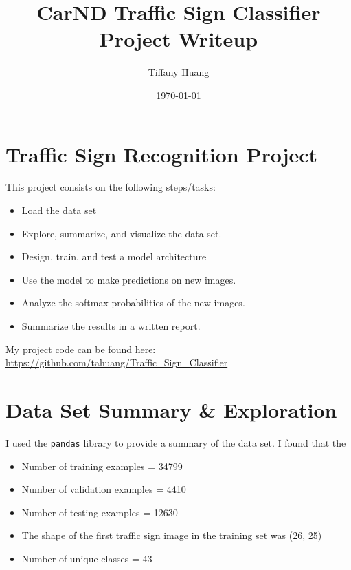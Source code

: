 \documentclass[12pt]{article}
\title{CarND Traffic Sign Classifier Project Writeup}
\author{Tiffany Huang}
\date{\today}
\begin{document}
\maketitle


\section{Traffic Sign Recognition Project}
This project consists on the following steps/tasks:
\begin{itemize}
\item{Load the data set}
\item {Explore, summarize, and visualize the data set.}
\item {Design, train, and test a model architecture}
\item {Use the model to make predictions on new images.}
\item {Analyze the softmax probabilities of the new images.}
\item {Summarize the results in a written report.}
\end{itemize}
My project code can be found here: \url{https://github.com/tahuang/Traffic_Sign_Classifier}

\section{Data Set Summary \& Exploration}
I used the \texttt{pandas} library to provide a summary of the data set. I found that the
\begin{itemize}
\item {Number of training examples = 34799}
\item {Number of validation examples = 4410}
\item {Number of testing examples = 12630}
\item {The shape of the first traffic sign image in the training set was (26, 25)}
\item {Number of unique classes = 43}
\end{itemize}
\end{document}

